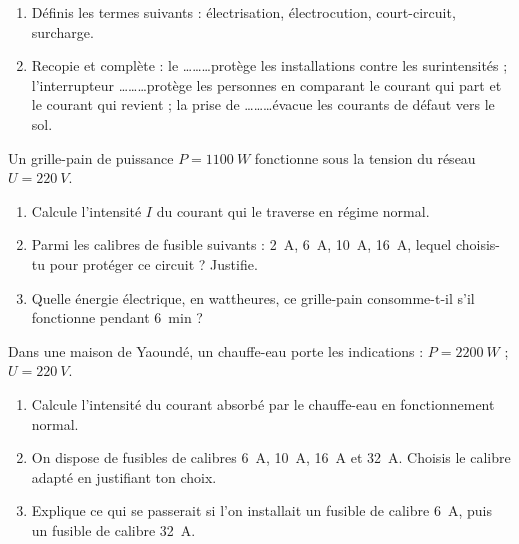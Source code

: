 \documentclass[11pt]{article}
\newcommand{\cle}[1]{{\popxbold\color{popdark}#1}}
\newcounter{popsec}
\newcounter{popsub}
\newcommand{\courssub}[1]{%
  \stepcounter{popsub}%
  \par\vspace{9pt}\noindent{\popxbold\fontsize{11.5}{13}\selectfont\color{popink}{\color{poporange}\thepopsec.\thepopsub}\hspace{6pt}#1}\par\nopagebreak\vspace{4pt}
}
\begin{document}
\begin{exercice}
\begin{enumerate}
\item Définis les termes suivants : \cle{électrisation}, \cle{électrocution}, \cle{court-circuit}, \cle{surcharge}.
\item Recopie et complète : le \ldots\ldots\ldots protège les installations contre les surintensités ; l'interrupteur \ldots\ldots\ldots protège les personnes en comparant le courant qui part et le courant qui revient ; la prise de \ldots\ldots\ldots évacue les courants de défaut vers le sol.
\end{enumerate}
\end{exercice}

\begin{exercice}
Un grille-pain de puissance $P = \SI{1100}{W}$ fonctionne sous la tension du réseau $U = \SI{220}{V}$.
\begin{enumerate}
\item Calcule l'intensité $I$ du courant qui le traverse en régime normal.
\item Parmi les calibres de fusible suivants : \SI{2}{A}, \SI{6}{A}, \SI{10}{A}, \SI{16}{A}, lequel choisis-tu pour protéger ce circuit ? Justifie.
\item Quelle énergie électrique, en wattheures, ce grille-pain consomme-t-il s'il fonctionne pendant \SI{6}{min} ?
\end{enumerate}
\end{exercice}

\courssub{Je m'entraîne}

\begin{exercice}
Dans une maison de Yaoundé, un chauffe-eau porte les indications : $P = \SI{2200}{W}$ ; $U = \SI{220}{V}$.
\begin{enumerate}
\item Calcule l'intensité du courant absorbé par le chauffe-eau en fonctionnement normal.
\item On dispose de fusibles de calibres \SI{6}{A}, \SI{10}{A}, \SI{16}{A} et \SI{32}{A}. Choisis le calibre adapté en justifiant ton choix.
\item Explique ce qui se passerait si l'on installait un fusible de calibre \SI{6}{A}, puis un fusible de calibre \SI{32}{A}.
\end{enumerate}
\end{exercice}
\end{document}
